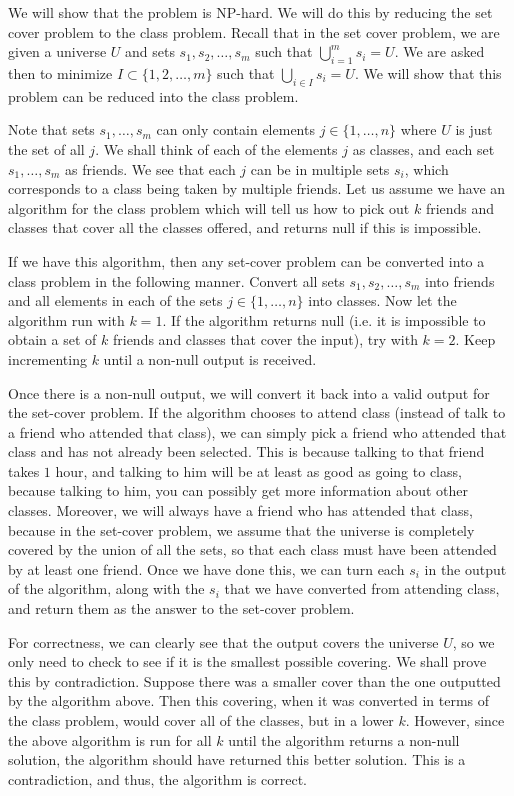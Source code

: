 \documentclass[psamsfonts]{amsart}
\newenvironment{sol}{{\bfseries Solution}}{\qedsymbol}
\theoremstyle{definition}
\theoremstyle{remark}
\numberwithin{equation}{section}
\begin{document}
\begin{sol}
We will show that the problem is NP-hard. We will do this by reducing the set cover problem to the class problem. Recall that in the set cover problem, we are given a universe $U$ and sets $s_1, s_2, \ldots, s_m$ such that $\bigcup_{i=1}^m s_i = U$. We are asked then to minimize $I \subset \{1,2, \ldots, m\}$ such that $\bigcup_{i \in I} s_i = U$. We will show that this problem can be reduced into the class problem.

Note that sets $s_1, \ldots, s_m$ can only contain elements $j \in \{1, \ldots, n \}$ where $U$ is just the set of all $j$. We shall think of each of the elements $j$ as classes, and each set $s_1, \ldots, s_m$ as friends. We see that each $j$ can be in multiple sets $s_i$, which corresponds to a class being taken by multiple friends. Let us assume we have an algorithm for the class problem which will tell us how to pick out $k$ friends and classes that cover all the classes offered, and returns null if this is impossible. 

If we have this algorithm, then any set-cover problem can be converted into a class problem in the following manner. Convert all sets $s_1, s_2, \ldots, s_m$ into friends and all elements in each of the sets $j \in \{1, \ldots, n\}$ into classes. Now let the algorithm run with $k = 1$. If the algorithm returns null (i.e. it is impossible to obtain a set of $k$ friends and classes that cover the input), try with $k = 2$. Keep incrementing $k$ until a non-null output is received. 

Once there is a non-null output, we will convert it back into a valid output for the set-cover problem. If the algorithm chooses to attend class (instead of talk to a friend who attended that class), we can simply pick a friend who attended that class and has not already been selected. This is because talking to that friend takes $1$ hour, and talking to him will be at least as good as going to class, because talking to him, you can possibly get more information about other classes. Moreover, we will always have a friend who has attended that class, because in the set-cover problem, we assume that the universe is completely covered by the union of all the sets, so that each class must have been attended by at least one friend. Once we have done this, we can turn each $s_i$ in the output of the algorithm, along with the $s_i$ that we have converted from attending class, and return them as the answer to the set-cover problem.

For correctness, we can clearly see that the output covers the universe $U$, so we only need to check to see if it is the smallest possible covering. We shall prove this by contradiction. Suppose there was a smaller cover than the one outputted by the algorithm above. Then this covering, when it was converted in terms of the class problem, would cover all of the classes, but in a lower $k$. However, since the above algorithm is run for all $k$ until the algorithm returns a non-null solution, the algorithm should have returned this better solution. This is a contradiction, and thus, the algorithm is correct.


\end{sol}
\end{document}
